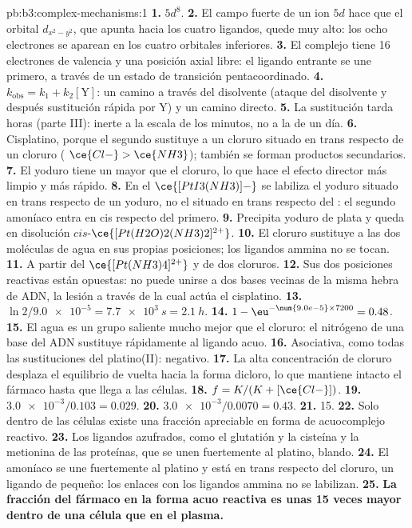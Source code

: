 \begin{solution}{pb:b3:complex-mechanisms:1}
\textbf{1.} $5d^8$.
\textbf{2.} El campo fuerte de un ion $5d$ hace que el orbital $d_{x^2-y^2}$, que apunta hacia los cuatro
ligandos, quede muy alto: los ocho electrones se aparean en los cuatro orbitales inferiores.
\textbf{3.} El complejo tiene 16 electrones de valencia y una posición axial libre: el ligando
entrante se une primero, a través de un estado de transición pentacoordinado.
\textbf{4.} $k_{\mathrm{obs}} = k_1 + k_2[\mathrm Y]$: un camino a través del disolvente (ataque del disolvente y después sustitución rápida por Y)
y un camino directo.
\textbf{5.} La sustitución tarda horas (parte III): inerte a la escala de los minutos, no a la de
un día.
\textbf{6.} Cisplatino, porque el segundo  sustituye a un cloruro situado en trans respecto de un cloruro
( $\ce{Cl-} > \ce{NH3}$); también se forman productos secundarios.
\textbf{7.} El yoduro tiene un  mayor que el cloruro, lo que hace el efecto
director más limpio y más rápido.
\textbf{8.} En el $\ce{[PtI3(NH3)]-}$ se labiliza el yoduro situado en trans respecto de un yoduro, no el situado en trans respecto del
: el segundo amoníaco entra en cis respecto del primero.
\textbf{9.} Precipita yoduro de plata y queda en disolución $cis$-$\ce{[Pt(H2O)2(NH3)2]^{2+}}$.
\textbf{10.} El cloruro sustituye a las dos moléculas de agua en sus propias posiciones; los
ligandos ammina no se tocan.
\textbf{11.} A partir del $\ce{[Pt(NH3)4]^{2+}}$ y de dos cloruros.
\textbf{12.} Sus dos posiciones reactivas están opuestas: no puede unirse a dos
bases vecinas de la misma hebra de ADN, la lesión a través de la cual actúa el
cisplatino.
\textbf{13.} $\ln2/\num{9.0e-5} = \qty{7.7e3}{s} = \qty{2.1}{h}$.
\textbf{14.} $1 - \eu^{-\num{9.0e-5} \times 7200} = 0.48$.
\textbf{15.} El agua es un grupo saliente mucho mejor que el cloruro: el nitrógeno de una base del ADN
sustituye rápidamente al ligando acuo.
\textbf{16.} Asociativa, como todas las sustituciones del platino(II): 
negativo.
\textbf{17.} La alta concentración de cloruro desplaza el equilibrio de vuelta hacia la
forma dicloro, lo que mantiene intacto el fármaco hasta que llega a las células.
\textbf{18.} $f = K/(K + [\ce{Cl-}])$.
\textbf{19.} $\num{3.0e-3}/0.103 = 0.029$.
\textbf{20.} $\num{3.0e-3}/0.0070 = 0.43$.
\textbf{21.} 15.
\textbf{22.} Solo dentro de las células existe una fracción apreciable en forma de acuocomplejo
reactivo.
\textbf{23.} Los ligandos azufrados, como el glutatión y la cisteína y la metionina de las
proteínas, que se unen fuertemente al platino, blando.
\textbf{24.} El amoníaco se une fuertemente al platino y está en trans respecto del cloruro, un ligando de
 pequeño: los enlaces con los ligandos ammina no se labilizan.
\textbf{25.} \textbf{La fracción del fármaco en la forma acuo reactiva es unas 15 veces mayor dentro de una
célula que en el plasma.}
\end{solution}
